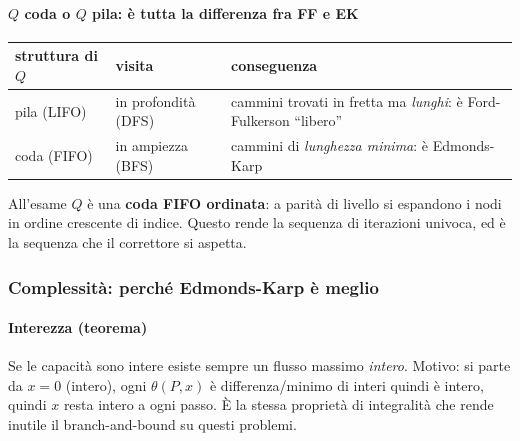 \documentclass[12pt]{extarticle} %
\begin{document}
\paragraph{$Q$ coda o $Q$ pila: è tutta la differenza fra FF e EK}
\begin{center}
\begin{tabular}{lll}
\hline
\textbf{struttura di $Q$} & \textbf{visita} & \textbf{conseguenza} \\
\hline
pila (LIFO) & in profondità (DFS) & cammini trovati in fretta ma \emph{lunghi}: è Ford-Fulkerson ``libero'' \\
coda (FIFO) & in ampiezza (BFS) & cammini di \emph{lunghezza minima}: è Edmonds-Karp \\
\hline
\end{tabular}
\end{center}
\noindent All'esame $Q$ è una \textbf{coda FIFO ordinata}: a parità di livello si espandono i nodi in ordine crescente di indice. Questo rende la sequenza di iterazioni univoca, ed è la sequenza che il correttore si aspetta.

\subsubsection{Complessità: perché Edmonds-Karp è meglio}
\paragraph{Interezza (teorema)}
Se le capacità sono intere esiste sempre un flusso massimo \emph{intero}. Motivo: si parte da $x=0$ (intero), ogni $\theta(P,x)$ è differenza/minimo di interi quindi è intero, quindi $x$ resta intero a ogni passo. È la stessa proprietà di integralità che rende inutile il branch-and-bound su questi problemi.
\end{document}
